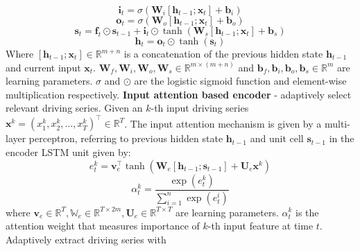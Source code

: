 \documentclass{article}
\begin{document}
\begin{equation}
    \textbf{i}_{t} = \sigma(\textbf{W}_{i}[\textbf{h}_{t-1};\textbf{x}_{t}] + \textbf{b}_{i})
\end{equation}
\begin{equation}
    \textbf{o}_{t} = 
    \sigma(\textbf{W}_{o}[\textbf{h}_{t-1};\textbf{x}_{t}] + \textbf{b}_{o})
\end{equation}
\begin{equation}
    \textbf{s}_{t} = \textbf{f}_{t} \odot \textbf{s}_{t-1} + \textbf{i}_{t} \odot \tanh(\textbf{W}_{s}[\textbf{h}_{t-1}; \textbf{x}_{t}] + \textbf{b}_{s})
\end{equation}
\begin{equation}
    \textbf{h}_{t} = \textbf{o}_{t} \odot \tanh(\textbf{s}_{t})
\end{equation}
Where $[\textbf{h}_{t-1}; \textbf{x}_{t}] \in \mathbb{R}^{m+n}$ is a concatenation of the previous hidden state $\textbf{h}_{t-1}$ and current input $\textbf{x}_{t}$. $\textbf{W}_{f}, \textbf{W}_{i}, \textbf{W}_{o}, \textbf{W}_{s} \in \mathbb{R}^{m \times (m+n)}$ and $\textbf{b}_{f}, \textbf{b}_{i}, \textbf{b}_{o}, \textbf{b}_{s} \in \mathbb{R}^{m}$ are learning parameters. $\sigma$ and $\odot$ are the logistic sigmoid function and element-wise multiplication respectively.  \newline
\textbf{Input attention based encoder} - adaptively select relevant driving series. \newline
Given an $k$-th input driving series $\textbf{x}^{k} = (x_{1}^{k}, x_{2}^{k}, \hdots, x_{T}^{k})^{\intercal} \in \mathbb{R}^{T}$. The input attention mechanism is given by a multi-layer perceptron, referring to previous hidden state $\textbf{h}_{t-1}$ and unit cell $\textbf{s}_{t-1}$ in the encoder LSTM unit given by:
\begin{equation}
    e_{t}^{k} = \textbf{v}_{e}^{\intercal}\tanh(\textbf{W}_{e}[\textbf{h}_{t-1}; \textbf{s}_{t-1}] + \textbf{U}_{e}\textbf{x}^{k})
\end{equation}
\begin{equation}
    \alpha_{t}^{k} = \frac{ \exp(e_{t}^{k})}{\sum_{i=1}^{n} \exp(e_{t}^{i})}
\end{equation}
where $\textbf{v}_{e} \in \mathbb{R}^{T}, \mathbb{W}_{e} \in \mathbb{R}^{T \times 2m}, \textbf{U}_{e} \in \mathbb{R}^{T \times T}$ are learning parameters. $\alpha_{t}^{k}$ is the attention weight that measures importance of $k$-th input feature at time $t$. \newline
Adaptively extract driving series with
\end{document}
